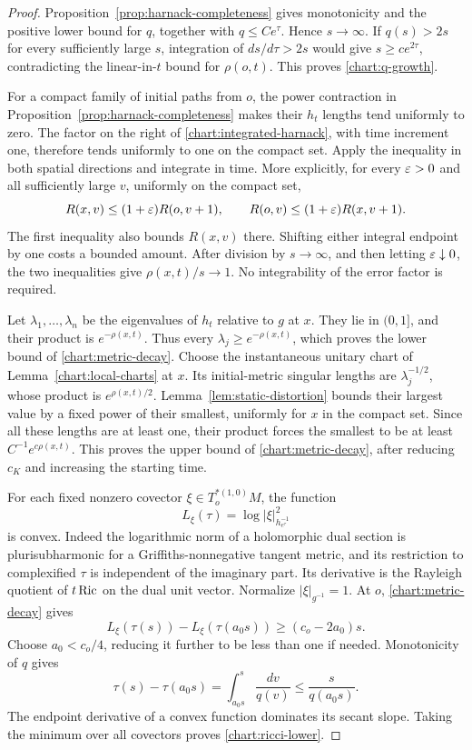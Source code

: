 \begin{proof}
Proposition~\ref{prop:harnack-completeness} gives monotonicity and
the positive lower bound for $q$, together with $q\le Ce^\tau$.
Hence $s\to\infty$.  If $q(s)>2s$ for every sufficiently large
$s$, integration of $ds/d\tau>2s$ would give
$s\ge ce^{2\tau}$, contradicting the linear-in-$t$ bound for
$\rho(o,t)$.  This proves \eqref{chart:q-growth}.

For a compact family of initial paths from $o$, the power
contraction in Proposition~\ref{prop:harnack-completeness} makes
their $h_t$ lengths tend uniformly to zero.  The factor on the
right of \eqref{chart:integrated-harnack}, with time increment
one, therefore tends uniformly to one on the compact set.  Apply
the inequality in both spatial directions and integrate in time.
More explicitly, for every $\varepsilon>0$ and all sufficiently large
$v$, uniformly on the compact set,
\[
 R(x,v)\le(1+\varepsilon)R(o,v+1),\qquad
 R(o,v)\le(1+\varepsilon)R(x,v+1).
\]
The first inequality also bounds $R(x,v)$ there.  Shifting either
integral endpoint by one costs a bounded amount.  After division
by $s\to\infty$, and then letting $\varepsilon\downarrow0$, the two
inequalities give $\rho(x,t)/s\to1$.  No integrability of the
error factor is required.

Let $\lambda_1,\ldots,\lambda_n$ be the eigenvalues of $h_t$
relative to $g$ at $x$.  They lie in $(0,1]$, and their product
is $e^{-\rho(x,t)}$.  Thus every $\lambda_j\ge e^{-\rho(x,t)}$,
which proves the lower bound of \eqref{chart:metric-decay}.
Choose the instantaneous unitary chart of
Lemma~\ref{chart:local-charts} at $x$.  Its initial-metric
singular lengths are $\lambda_j^{-1/2}$, whose product is
$e^{\rho(x,t)/2}$.  Lemma~\ref{lem:static-distortion} bounds
their largest value by a fixed power of their smallest, uniformly
for $x$ in the compact set.  Since all these lengths are at least
one, their product forces the smallest to be at least
$C^{-1}e^{c\rho(x,t)}$.  This proves the upper bound of
\eqref{chart:metric-decay}, after reducing $c_K$ and increasing
the starting time.

For each fixed nonzero covector $\xi\in T_o^{*(1,0)}M$, the
function
\[
 L_\xi(\tau)=\log|\xi|_{h_{e^\tau}^{-1}}^2
\]
is convex.  Indeed the logarithmic norm of a holomorphic dual
section is plurisubharmonic for a Griffiths-nonnegative tangent
metric, and its restriction to complexified $\tau$ is independent
of the imaginary part.  Its derivative is the Rayleigh quotient
of $t\operatorname{Ric}$ on the dual unit vector.  Normalize $|\xi|_{g^{-1}}=1$.
At $o$, \eqref{chart:metric-decay} gives
\[
 L_\xi(\tau(s))-L_\xi(\tau(a_0s))
 \ge(c_o-2a_0)s.
\]
Choose $a_0<c_o/4$, reducing it further to be less than one if
needed.  Monotonicity of $q$ gives
\[
 \tau(s)-\tau(a_0s)
 =\int_{a_0s}^s\frac{dv}{q(v)}
 \le\frac{s}{q(a_0s)}.
\]
The endpoint derivative of a convex function dominates its secant
slope.  Taking the minimum over all covectors proves
\eqref{chart:ricci-lower}.


\end{proof}
